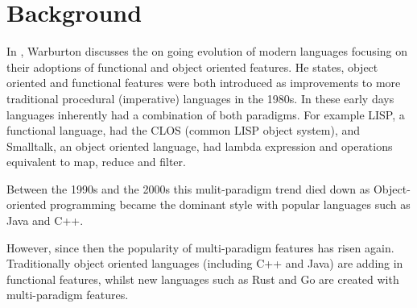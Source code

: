 \documentclass[ oneside,%
                    author={James Elgar},
                    degree={MEng},
                     title={Bidirectional transformer between functional and \\ object-oriented programming in Rust},
                  subtitle={}]{dissertation}
\begin{document}



\chapter{Background}
\label{chap:technical}

In \cite{warburton}, Warburton discusses the on going evolution of modern languages focusing on their adoptions of functional and object oriented features. He states, object oriented and functional features were both introduced as improvements to more traditional procedural (imperative) languages in the 1980s. In these early days languages inherently had a combination of both paradigms. For example LISP, a functional language, had the CLOS (common LISP object system), and Smalltalk, an object oriented language, had lambda expression and operations equivalent to map, reduce and filter.

Between the 1990s and the 2000s this mulit-paradigm trend died down as Object-oriented programming became the dominant style with popular languages such as Java and C++.

However, since then the popularity of multi-paradigm features has risen again. Traditionally object oriented languages (including C++ and Java) are adding in functional features, whilst new languages such as Rust and Go are created with multi-paradigm features.
\end{document}
